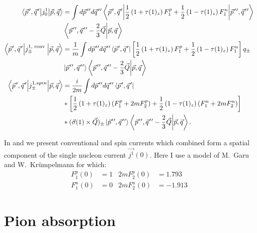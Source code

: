     \begin{align}
            \matrixel**{\pvec{p}, \pvec{q}}{j_0^1}{\vec{p}, \vec{q}} 
            & =\int d \ppvec{p} d \ppvec{q}
            \matrixel**{\pvec{p}, \pvec{q}}{\frac{1}{2}\left(1+\tau(1)_z\right) F_1^p+\frac{1}{2}\left(1-\tau(1)_z\right) F_1^n}{\ppvec{p}, \ppvec{q}}\nonumber\\
            &\braket{\ppvec{p}, \ppvec{q}-\frac{2}{3} \vec{Q}}{\vec{p}, \vec{q}} \\
            \matrixel**{\pvec{p}, \pvec{q}}{j_{ \pm}^{1, \text { conv }}} {\vec{p}, \vec{q}} 
            & =\frac{1}{m} \int d \ppvec{p} d \ppvec{q}
            \bra{\pvec{p}, \pvec{q}}\left[\frac{1}{2}\left(1+\tau(1)_z\right) F_1^p+\frac{1}{2}\left(1-\tau(1)_z\right) F_1^n \right] q_{ \pm}\nonumber\\
            &\ket{\ppvec{p}, \ppvec{q}}
            \braket{\ppvec{p}, \ppvec{q}-\frac{2}{3} \vec{Q}}{\vec{p}, \vec{q}} \label{3n_conv}\\
            \matrixel**{\pvec{p}, \pvec{q}}{j_{ \pm}^{1, spin}}{\vec{p}, \vec{q}} 
            & =\frac{i}{2 m} \int d \ppvec{p} d \ppvec{q}
            \bra{\pvec{p}, \pvec{q}}\nonumber\\
            & *\left[\frac{1}{2}\left(1+\tau(1)_z\right)\left(F_1^p+2 m F_2^p\right)+\frac{1}{2}\left(1-\tau(1)_z\right)\left(F_1^n+2 m F_2^n\right)\right] \nonumber \\
            & *(\vec{\sigma}(1) \times \vec{Q})_{ \pm}\ket{\ppvec{p}, \ppvec{q}}\braket{\ppvec{p}, \ppvec{q}-\frac{2}{3} \vec{Q}}{\vec{p}, \vec{q}} .
            \label{3n_spin}
    \end{align}

    In  and  we present conventional and spin currents which combined form a spatial component of the 
    single nucleon current $\vec{j^1}(0)$. Here I use a model of M.~Garu and W.~Kr\"umpelmann  \cite{GARI198610} for which:
    \begin{align}
            F_1^p(0)&=1 & 2 m F_2^p(0)&=1.793 \\
            F_1^n(0)&=0 & 2 m F_2^n(0)&=-1.913
    \end{align}


    \section{Pion absorption}

